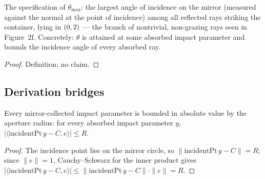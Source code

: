 \begin{definition}
\label{def:IPhO2026Problems_problem_IPhO_2026_2_B_2:ThetaMaxSpec}
The specification of $\theta_{\max}$: the largest angle of incidence on
the mirror (measured against the normal at the point of incidence) among
all reflected rays striking the container, lying in $(0, \/2)$ --- the
branch of nontrivial, non-grazing rays seen in Figure~2f.  Concretely:
$\theta$ is attained at some absorbed impact parameter and bounds the
incidence angle of every absorbed ray.
\end{definition}
\begin{proof}
Definition; no claim.
\end{proof}

\subsection*{Derivation bridges}

\begin{lemma}
\label{lem:IPhO2026Problems_problem_IPhO_2026_2_B_2:impactParam_le_aperture}
Every mirror-collected impact parameter is bounded in absolute value by
the aperture radius: for every absorbed impact parameter $y$,
$|\langle \mathrm{incidentPt}\,y - C, e\rangle| \le R$.
\end{lemma}
\begin{proof}
The incidence point lies on the mirror circle, so
$\|\mathrm{incidentPt}\,y - C\| = R$; since $\|e\| = 1$,
Cauchy--Schwarz for the inner product gives
$|\langle \mathrm{incidentPt}\,y - C, e\rangle| \le
\|\mathrm{incidentPt}\,y - C\| \cdot \|e\| = R$.
\end{proof}

